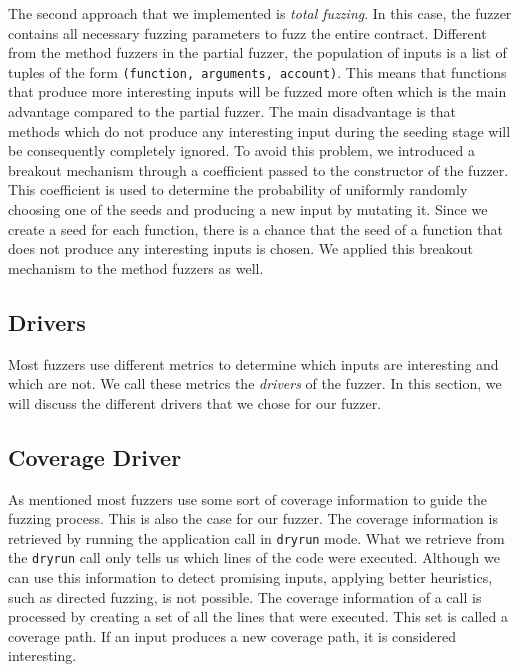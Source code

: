 The second approach that we implemented is \textit{total fuzzing}.
In this case, the fuzzer contains all necessary fuzzing parameters to fuzz the entire contract.
Different from the method fuzzers in the partial fuzzer, the population of inputs is a list of tuples of the form \texttt{(function, arguments, account)}.
This means that functions that produce more interesting inputs will be fuzzed more often which is the main advantage compared to the partial fuzzer.
The main disadvantage is that methods which do not produce any interesting input during the seeding stage will be consequently completely ignored.
To avoid this problem, we introduced a breakout mechanism through a coefficient passed to the constructor of the fuzzer.
This coefficient is used to determine the probability of uniformly randomly choosing one of the seeds and producing a new input by mutating it.
Since we create a seed for each function, there is a chance that the seed of a function that does not produce any interesting inputs is chosen.
We applied this breakout mechanism to the method fuzzers as well.



\subsection*{Drivers}\label{section:drivers}
Most fuzzers use different metrics to determine which inputs are interesting and which are not.
We call these metrics the \textit{drivers} of the fuzzer.
In this section, we will discuss the different drivers that we chose for our fuzzer.

\subsection*{Coverage Driver}
As mentioned most fuzzers use some sort of coverage information to guide the fuzzing process.
This is also the case for our fuzzer.
The coverage information is retrieved by running the application call in \texttt{dryrun} mode.
What we retrieve from the \texttt{dryrun} call only tells us which lines of the code were executed.
Although we can use this information to detect promising inputs, applying better heuristics, such as directed fuzzing, is not possible.
The coverage information of a call is processed by creating a set of all the lines that were executed.
This set is called a coverage path.
If an input produces a new coverage path, it is considered interesting.

